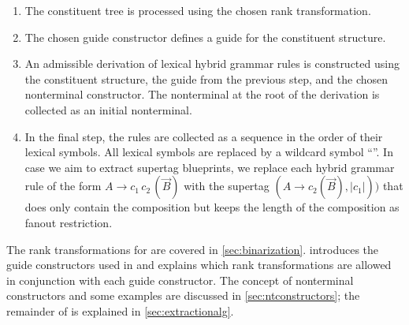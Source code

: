 \documentclass[../../document.tex]{subfiles}
\begin{document}
    \begin{enumerate}
        \item\label{extraction:hg:ranktrans}
            The constituent tree is processed using the chosen rank transformation.
        \item\label{extraction:hg:guide}
            The chosen guide constructor defines a guide for the constituent structure.
        \item\label{extraction:hg:alg}
            An admissible derivation of lexical hybrid grammar rules is constructed using the constituent structure, the guide from the previous step, and the chosen nonterminal constructor.
            The  nonterminal at the root of the derivation is collected as an initial nonterminal.
        \item
            In the final step, the rules are collected as a sequence in the order of their lexical symbols.
            All lexical symbols are replaced by a wildcard symbol ``\wildcard{}''.
            In case we aim to extract  supertag blueprints, we replace each hybrid grammar rule of the form \(A \to c_1\,c_2\,(\vec{B})\) with the  supertag \((A \to c_2 (\vec{B}), |c_1|))\) that does only contain the  composition but keeps the length of the  composition as fanout restriction.
    \end{enumerate}
    The rank transformations for  are covered in \cref{sec:binarization}.
     introduces the guide constructors used in  and explains which rank transformations are allowed in conjunction with each guide constructor.
    The concept of nonterminal constructors and some examples are discussed in \cref{sec:ntconstructors}; the remainder of  is explained in \cref{sec:extractionalg}.
    

    
    
    

    \ifSubfilesClassLoaded{%
        \printindex
    }{}
\end{document}
